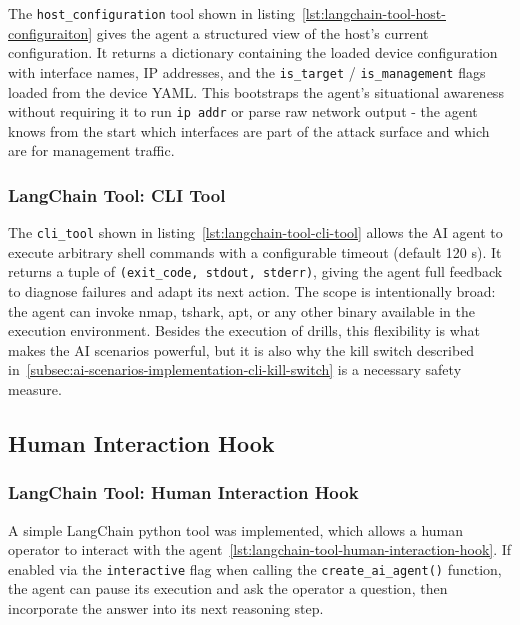 The \texttt{host_configuration} tool shown in listing~\ref{lst:langchain-tool-host-configuraiton} gives the agent a structured view of the host's current configuration.
It returns a dictionary containing the loaded device configuration with interface names, \gls{IP} addresses,
and the \texttt{is_target} / \texttt{is_management} flags loaded from the device \gls{YAML}.
This bootstraps the agent's situational awareness without requiring it to run \texttt{ip addr}
or parse raw network output - the agent knows from the start which interfaces are part of the attack surface and which are for management traffic.


\subsubsection{LangChain Tool: CLI Tool}\label{subsubsec:langchain-tool-cli-tool}

The \texttt{cli_tool} shown in listing~\ref{lst:langchain-tool-cli-tool} allows the \gls{AI} agent to execute arbitrary shell commands with a configurable timeout (default 120 s).
It returns a tuple of \texttt{(exit_code, stdout, stderr)}, giving the agent full feedback to diagnose failures and adapt its next action.
The scope is intentionally broad: the agent can invoke nmap, tshark, apt, or any other binary available in the execution environment.
Besides the execution of drills, this flexibility is what makes the \gls{AI} scenarios powerful,
but it is also why the kill switch described in~\ref{subsec:ai-scenarios-implementation-cli-kill-switch} is a necessary safety measure.


\subsection{Human Interaction Hook}\label{subsec:ai-scenarios-implementation-human-interaction-hook-via-cli}

\subsubsection{LangChain Tool: Human Interaction Hook}\label{subsubsec:langchain-tool-human-interaction-hook}

A simple LangChain python tool was implemented,
which allows a human operator to interact with the agent~\ref{lst:langchain-tool-human-interaction-hook}.
If enabled via the \texttt{interactive} flag when calling the \texttt{create_ai_agent()} function,
the agent can pause its execution and ask the operator a question, then incorporate the answer into its next reasoning step.


